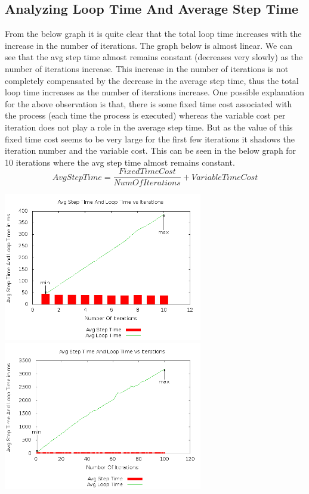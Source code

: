 \documentclass[11pt]{article}
\begin{document}
	\subsection{Analyzing Loop Time And Average Step Time }
	 From the below graph it is quite clear that the total loop time increases with the increase in the number of iterations. The graph below is almost linear. We can see that the avg step time almost remains constant (decreases very slowly) as the number of iterations increase. This increase in the number of iterations is not completely compensated by the decrease in the average step time, thus the total loop time increases as the number of iterations increase. \newline
	One possible explanation for the above observation is that, there is some fixed time cost associated with the process (each time the process is executed) whereas the variable cost per iteration does not play a role in the average step time. But as the value of this fixed time cost seems to be very large for the first few iterations it shadows the iteration number and the variable cost. This can be seen in the below graph for 10 iterations where the avg step time almost remains constant.\newline
\begin{equation*} AvgStepTime = \frac{FixedTimeCost}{NumOfIterations} + VariableTimeCost \end{equation*} \newline

	\begin{center}\includegraphics[height=6.5cm]{10_10_plot01.png}\includegraphics[height=6.5cm]{100_30_plot01.png}\end{center}
\end{document}
